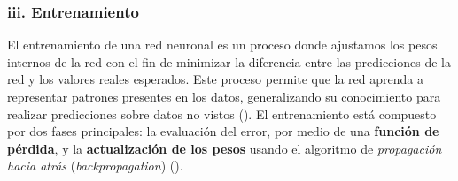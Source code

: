\documentclass[11pt]{article} %
\begin{document}
\subsubsection{iii. Entrenamiento}
\vspace{3pt}
El entrenamiento de una red neuronal es un proceso donde ajustamos los pesos internos de la red con el fin de minimizar la diferencia entre las predicciones de la red y los valores reales esperados. Este proceso permite que la red aprenda a representar patrones presentes en los datos, generalizando su conocimiento para realizar predicciones sobre datos no vistos (\cite{zhou2020graph}). El entrenamiento está compuesto por dos fases principales: la evaluación del error, por medio de una \textbf{función de pérdida}, y la \textbf{actualización de los pesos} usando el algoritmo de \textit{propagación hacia atrás} (\textit{backpropagation}) (\cite{nvidia}).
\end{document}
